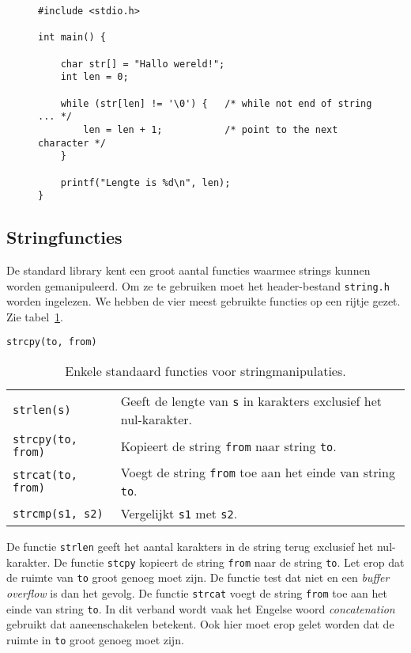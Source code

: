 \begin{figure}[!ht]
\begin{lstlisting}[caption=Berekenen van de lengte van een string.,label=cod:arrstrlen1]
#include <stdio.h>

int main() {

    char str[] = "Hallo wereld!";
    int len = 0;

    while (str[len] != '\0') {   /* while not end of string ... */
        len = len + 1;           /* point to the next character */
    }

    printf("Lengte is %d\n", len);
}
\end{lstlisting}
\end{figure}

\subsection{Stringfuncties}
De standard library kent een groot aantal functies waarmee strings kunnen worden gemanipuleerd. Om ze te gebruiken moet het header-bestand \texttt{string.h} worden ingelezen. We hebben de vier meest gebruikte functies op een rijtje gezet. Zie tabel~\ref{tab:arystringmanip}.

\hbox{\texttt{strcpy(to, from)}}
\begin{table}[!ht]
\centering
\caption{Enkele standaard functies voor stringmanipulaties.}
\label{tab:arystringmanip}
\begin{tabular}{@{}p{4cm}l@{}}
\toprule
\texttt{strlen(s)} &  Geeft de lengte van \texttt{s} in karakters exclusief het nul-karakter.\\
\texttt{strcpy(to, from)} &  Kopieert de string \texttt{from} naar string \texttt{to}.\\
\texttt{strcat(to, from)} &  Voegt de string \texttt{from} toe aan het einde van string \texttt{to}.\\
\texttt{strcmp(s1, s2)} &  Vergelijkt \texttt{s1} met \texttt{s2}.\\
\bottomrule
\end{tabular} 
\end{table}

De functie \texttt{strlen} geeft het aantal karakters in de string terug exclusief het nul-karakter. De functie \texttt{stcpy} kopieert de string \texttt{from} naar de string \texttt{to}. Let erop dat de ruimte van \texttt{to} groot genoeg moet zijn. De functie test dat niet en een \textsl{buffer overflow} is dan het gevolg. De functie \texttt{strcat} voegt de string \texttt{from} toe aan het einde van string \texttt{to}. In dit verband wordt vaak het Engelse woord \textsl{concatenation} gebruikt dat aaneenschakelen betekent. Ook hier moet erop gelet worden dat de ruimte in \texttt{to} groot genoeg moet zijn.

